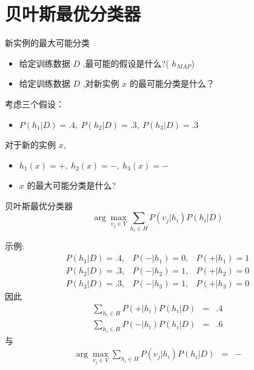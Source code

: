 \documentclass[presentation]{beamer}
\begin{document}
\section{贝叶斯最优分类器}
\label{sec:org6b3841a}
\begin{frame}[label={sec:org2424251}]{新实例的最大可能分类}
\begin{itemize}
\item 给定训练数据 \(D\) ,最可能的假设是什么?( \(h_{MAP}\))
\item 给定训练数据 \(D\) ,对新实例 \(x\) 的最可能分类是什么？
\end{itemize}

考虑三个假设：
\begin{itemize}
\item \(P(h_{1}|D)=.4, \  P(h_{2}|D)=.3, \  P(h_{3}|D)=.3\)
\end{itemize}

对于新的实例 \(x\), 
\begin{itemize}
\item \(h_{1}(x)=+, \ h_{2}(x)=-, \ h_{3}(x)=-\)
\item \(x\) 的最大可能分类是什么?
\end{itemize}
\end{frame}

\begin{frame}[label={sec:orgec20818}]{贝叶斯最优分类器}
$$\arg \max_{v_{j} \in V} \sum_{h_{i} \in H} P(v_{j}|h_{i}) P(h_{i}|D)$$
\end{frame}

\begin{frame}[label={sec:orgeba55e7}]{示例:}
\begin{eqnarray}
P(h_{1}|D)=.4, & P(-|h_{1})=0, & P(+|h_{1})=1 \nonumber \\
P(h_{2}|D)=.3, & P(-|h_{2})=1, & P(+|h_{2})=0 \nonumber \\
P(h_{3}|D)=.3, & P(-|h_{3})=1, & P(+|h_{3})=0 \nonumber 
\end{eqnarray}
因此
\begin{eqnarray}
\sum_{h_{i} \in H} P(+|h_{i}) P(h_{i}|D) & = & .4 \nonumber \\
\sum_{h_{i} \in H} P(-|h_{i}) P(h_{i}|D) & = & .6 \nonumber
\end{eqnarray}
与
\begin{eqnarray}
\arg \max_{v_{j} \in V} \sum_{h_{i} \in H} P(v_{j}|h_{i}) P(h_{i}|D) & = & -
\nonumber 
\end{eqnarray}
\end{frame}
\end{document}
